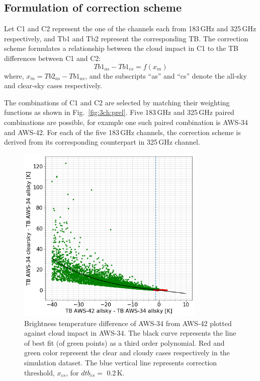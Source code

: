 \documentclass[12pt]{article}
\begin{document}
\subsection{Formulation of correction scheme}
\label{sec:correction:scheme}
%
Let C1 and C2 represent the one of the channels each from 183\,GHz and 325\,GHz
respectively, and Tb1 and Tb2 represent the corresponding TB. The correction
scheme formulates a relationship between the cloud impact in C1 to the TB
differences between C1 and C2:
\begin{equation}
Tb1_{as}-Tb1_{cs} = f(x_m)
\label{eq:TB:diff}
\end{equation}
where, $x_m = Tb2_{as} - Tb1_{as}$, and the subscripts ``as'' and ``cs'' denote the all-sky and clear-sky cases respectively.  

The combinations of C1 and C2 are selected by matching their weighting
functions as shown in Fig.~\ref{fig:3ch:prel}. Five 183\,GHz and 325\,GHz paired
combinations are possible, for example one such paired combination is AWS-34
and AWS-42. For each of the five 183\,GHz channels, the correction scheme is
derived from its corresponding counterpart in 325\,GHz channel.

\begin{figure}[!tb]
	\centering
	\includegraphics[height=85mm]{fit_AWS-34_AWS-42}\hspace{5mm}%
	\caption{Brightness temperature difference of AWS-34 from AWS-42 plotted
      against cloud impact in AWS-34. The black curve represents the line of
      best fit (of green points) as a third order polynomial. Red and green
      color represent the clear and cloudy cases respectively in the simulation
      dataset. The blue vertical line represents correction threshold, $x_{cs}$, for $dtb_{cs} =$
      0.2\,K. }
	\label{fig:fit:c34-42}
\end{figure}
%
\end{document}
